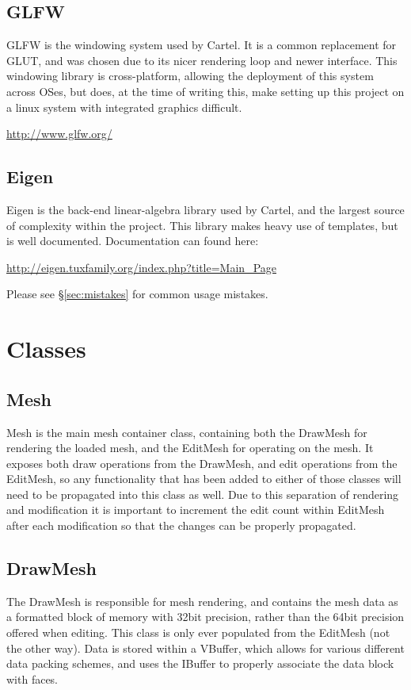 \documentclass{article}
\begin{document}
\subsection{GLFW}
GLFW is the windowing system used by Cartel. It is a common replacement for GLUT, and was chosen due to its nicer rendering loop and newer interface. This windowing library is cross-platform, allowing the deployment of this system across OSes, but does, at the time of writing this, make setting up this project on a linux system with integrated graphics difficult.
\begin{center}\url{http://www.glfw.org/}\end{center}

\subsection{Eigen}
Eigen is the back-end linear-algebra library used by Cartel, and the largest source of complexity within the project. This library makes heavy use of templates, but is well documented. Documentation can found here:
\begin{center}\url{http://eigen.tuxfamily.org/index.php?title=Main\_Page}\end{center}

Please see \S\ref{sec:mistakes} for common usage mistakes.

\section{Classes}

\subsection{Mesh}
Mesh is the main mesh container class, containing both the DrawMesh for rendering the loaded mesh, and the EditMesh for operating on the mesh. It exposes both draw operations from the DrawMesh, and edit operations from the EditMesh, so any functionality that has been added to either of those classes will need to be propagated into this class as well. Due to this separation of rendering and modification it is important to increment the edit count within EditMesh after each modification so that the changes can be properly propagated.

\subsection{DrawMesh}
The DrawMesh is responsible for mesh rendering, and contains the mesh data as a formatted block of memory with 32bit precision, rather than the 64bit precision offered when editing. This class is only ever populated from the EditMesh (not the other way). Data is stored within a VBuffer, which allows for various different data packing schemes, and uses the IBuffer to properly associate the data block with faces. 
\end{document}
